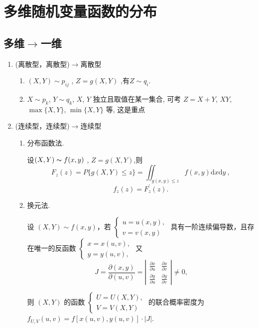 \chapter{多维随机变量函数的分布}

\section{多维$\rightarrow$一维}
\begin{enumerate}
    \item (离散型，离散型)$\rightarrow$离散型
          \begin{enumerate}
              \item $(X,Y)\sim p_{ij}$ , $Z=g(X,Y)$ ,有$Z\sim q_i$.
              \item $X \sim p_k$, $Y \sim q_k$, $X$, $Y$ 独立且取值在某一集合, 可考 $Z = X + Y$, $XY$, $\max\{X, Y\}$, $\min\{X, Y\}$ 等, 这是重点
          \end{enumerate}
    \item (连续型，连续型)$\rightarrow$连续型
          \begin{enumerate}
              \item 分布函数法.

                    设$( X, Y) \thicksim f( x, y)$ , $Z= g( X, Y)$,则
                    $$F_{z}(z)=P\{g(X,Y)\leqslant z\}=\iint_{g(x,y)\leqslant z}f(x,y)\mathrm{d}x\mathrm{d}y\:,$$
                    $$f_z(z)=F_z^{\prime}(z).$$
              \item 换元法.

                    设 $(X,Y) \sim f(x,y)$，若 $\begin{cases} u=u(x,y), \\ v=v(x,y) \end{cases}$ 具有一阶连续偏导数，且存在唯一的反函数 $\begin{cases} x=x(u,v), \\ y=y(u,v), \end{cases}$ 又
                    $$J=\frac{\partial(x,y)}{\partial(u,v)}=\left| \begin{array}{cc} \frac{\partial x}{\partial u} & \frac{\partial x}{\partial v} \\ \frac{\partial y}{\partial u} & \frac{\partial y}{\partial v} \end{array} \right| \neq 0 \text{,}$$

                    则 $(X,Y)$ 的函数 $\begin{cases} U=U(X,Y), \\ V=V(X,Y) \end{cases}$ 的联合概率密度为 $f_{U,V}(u,v)=f[x(u,v),y(u,v)]\cdot|J|$.


\end{enumerate}
\end{enumerate}
